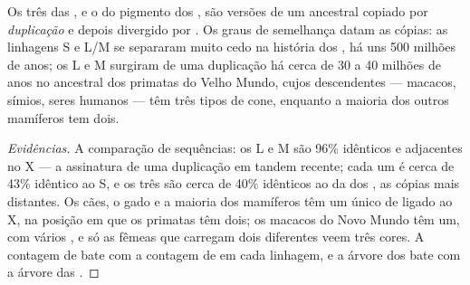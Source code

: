 \begin{proposition}\label{prop:g11:the-eye:family}
Os três  das , e o do pigmento dos , são versões
de um  ancestral copiado por \emph{duplicação} e depois divergido
por . Os graus de semelhança datam as cópias: as linhagens S e
L/M se separaram muito cedo na história dos , há uns 500
milhões de anos; os  L e M surgiram de uma duplicação há cerca de
30 a 40 milhões de anos no ancestral dos primatas do Velho Mundo, cujos
descendentes --- macacos, símios, seres humanos --- têm três tipos de
cone, enquanto a maioria dos outros mamíferos tem dois.
\end{proposition}
\begin{proof}[Evidências]
A comparação de sequências: os  L e M são 96\% idênticos e
adjacentes no X --- a assinatura de uma duplicação em tandem recente;
cada um é cerca de 43\% idêntico ao  S, e os três são cerca de 40\%
idênticos ao  da  dos , as cópias mais distantes.
Os cães, o gado e a maioria dos mamíferos têm um único  de 
ligado ao X, na posição em que os primatas têm dois; os macacos do Novo
Mundo têm um, com vários , e só as fêmeas que carregam dois
 diferentes veem três cores. A contagem de  bate com a
contagem de  em cada linhagem, e a árvore dos  bate com a
árvore das .
\end{proof}

